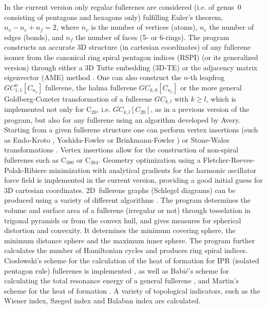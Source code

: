 \documentclass[article,a4paper,twoside]{memoir}
\newcommand{\C}[1]{\ensuremath{\mathrm{C}_{#1}}}
\begin{document}
In the current version only regular fullerenes are considered (i.e. of genus~0 consisting
of pentagons and hexagons only) fulfilling Euler's theorem, $n_v - n_e + n_f = 2$,
where $n_v$ is the number of vertices (atoms), $n_e$ the number of edges (bonds),
and $n_f$ the number of faces (5- or 6-rings). The program constructs an accurate
3D structure (in cartesian coordinates) of any fullerene isomer from the canonical
ring spiral pentagon indices (RSPI) (or its generalized version) through either a 3D Tutte embedding (3D-TE) \cite{Tutte}
or the adjacency matrix eigenvector (AME) method \cite{Atlas}. One can also construct
the $n$-th leapfrog $GC_{1,1}^n[C_{n_v}]$ fullerene, the halma fullerene $GC_{k,0}[C_{n_v}]$
or the more general Goldberg-Coxeter transformation of a fullerene $GC_{k,l}$
with $k \geq l$, which is implemented not only for \C{20}, i.e. $GC_{k,l}[C_{20}]$, as in a
previous version of the program, but also for any fullerene using an algorithm developed
by Avery.\cite{Avery2015}
Starting from a given fullerene structure one can perform vertex insertions (such
as Endo-Kroto \cite{Endo92}, Yoshida-Fowler \cite{Yoshida97a} or Brinkmann-Fowler \cite{BrinkmannFowler03})
or Stone-Wales transformations \cite{Stone86}.  Vertex insertions allow for the
construction of non-spiral fullerenes such as \C{380} or \C{384}.  Geometry optimization
using a Fletcher-Reeves-Polak-Ribiere minimization \cite{NumRec} with analytical
gradients for the harmonic oscillator force field \cite{Wu87,Wirz2015} is implemented in the
current version, providing a good initial guess for 3D cartesian coordinates.  2D~fullerene
graphs (Schlegel diagrams) can be produced using a variety of different algorithms \cite{Plestenjak}.
The program determines the volume and surface area of a fullerene (irregular or
not) through tesselation in trigonal pyramids or from the convex hull, and gives
measures for spherical distortion and convexity.  It determines the minimum covering
sphere, the minimum distance sphere and the maximum inner sphere.  The program further
calculates the number of Hamiltonian cycles and produces ring spiral indices.  Cioslowski's
scheme for the calculation of the heat of formation for IPR (isolated pentagon rule)
fullerenes is implemented \cite{Cioslowski2000}, as well as Babi{\'c}'s scheme for
calculating the total resonance energy of a general fullerene \cite{Babic1995,Babic1997},
and Martin's scheme for the heat of formation \cite{Alcami}.  A variety of topological
indicators, such as the Wiener index, Szeged index and Balaban index are calculated.\cite{Wiener1947,Balaban}
\end{document}
